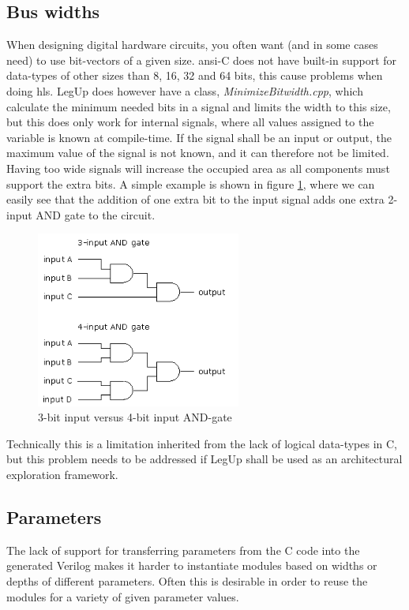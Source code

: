 \subsection{Bus widths}
When designing digital hardware circuits, you often want (and in some cases need) to use bit-vectors of a given size. \gls{ansi}-C does not have built-in support for data-types of other sizes than 8, 16, 32 and 64 bits, this cause problems when doing \gls{hls}. LegUp does however have a class, \textit{MinimizeBitwidth.cpp}, which calculate the minimum needed bits in a signal and limits the width to this size, but this does only work for internal signals, where all values assigned to the variable is known at compile-time. If the signal shall be an input or output, the maximum value of the signal is not known, and it can therefore not be limited. Having too wide signals will increase the occupied area as all components must support the extra bits. A simple example is shown in figure \ref{fig:andgate34}, where we can easily see that the addition of one extra bit to the input signal adds one extra 2-input AND gate to the circuit.
\begin{figure}[hbpt]
\centering
\includegraphics[width=0.6\textwidth]{../figs/AndGate34Bit.png}
\caption{\label{fig:andgate34}3-bit input versus 4-bit input AND-gate}
\end{figure}
Technically this is a limitation inherited from the lack of logical data-types in C, but this problem needs to be addressed if LegUp shall be used as an architectural exploration framework.
\subsection{\label{subsec:parameterprobs}Parameters}
The lack of support for transferring parameters from the C code into the generated Verilog makes it harder to instantiate modules based on widths or depths of different parameters. Often this is desirable in order to reuse the modules for a variety of given parameter values.
